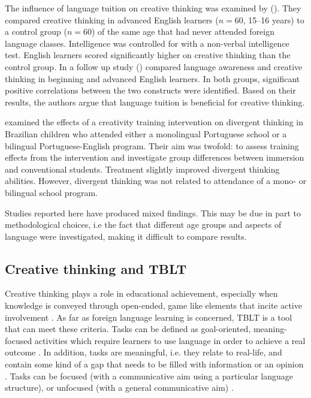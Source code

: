 \documentclass[output=paper]{langsci/langscibook}
\begin{document}
The influence of language tuition on creative thinking was examined by (\citealt{GhonsoolyShowqi2012}). They compared creative thinking in advanced English learners ($n=60$, 15--16 years) to a control group ($n=60$) of the same age that had never attended foreign language classes. Intelligence was controlled for with a non-verbal intelligence test. English learners scored significantly higher on creative thinking than the control group. In a follow up study (\citealt{ShowqiGhonsooly2015}) compared language awareness and creative thinking in beginning and advanced English learners. In both groups, significant positive correlations between the two constructs were identified. Based on their results, the authors argue that language tuition is beneficial for creative thinking.

\citet{FleithEtAl2002} examined the effects of a creativity training intervention on divergent thinking in Brazilian children who attended either a monolingual Portuguese school or a bilingual Portuguese-English program. Their aim was twofold: to assess training effects from the intervention and investigate group differences between immersion and conventional students. Treatment slightly improved divergent thinking abilities. However, divergent thinking was not related to attendance of a mono- or bilingual school program. 

Studies reported here have produced mixed findings. This may be due in part to methodological choices, i.e the fact that different age groups and aspects of language were investigated, making it difficult to compare results. 

\subsection{Creative thinking and TBLT}\label{sec:06:2.3}

Creative thinking plays a role in educational achievement, especially when knowledge is conveyed through open-ended, game like elements that incite active involvement \citep{Runco2004}. As far as foreign language learning is concerned, TBLT is a tool that can meet these criteria. Tasks can be defined as goal-oriented, meaning-focused activities which require learners to use language in order to achieve a real outcome \citep[2]{Willis1996}. In addition, tasks are meaningful, i.e. they relate to real-life, and contain some kind of a gap that needs to be filled with information or an opinion \citep{Ellis2017}. Tasks can be focused (with a communicative aim using a particular language structure), or unfocused (with a general communicative aim) \citep{Ellis2009}. 
\end{document}

